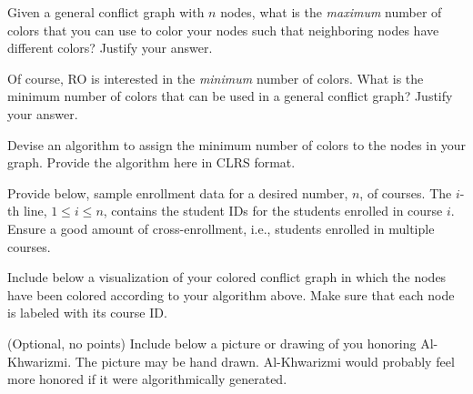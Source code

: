\documentclass[a4paper]{exam}
\begin{document}
\begin{questions}

\question
  Given a general conflict graph with $n$ nodes, what is the \textit{maximum} number of colors that you can use to color your nodes such that neighboring nodes have different colors? Justify your answer.
  \begin{solution}
    
  \end{solution}
\question
  Of course, RO is interested in the \textit{minimum} number of colors. What is the minimum number of colors that can be used in a general conflict graph? Justify your answer.
  \begin{solution}
    
  \end{solution}

\question
  Devise an algorithm to assign the minimum number of colors to the nodes in your graph. Provide the algorithm here in CLRS format.
  \begin{solution}
    
  \end{solution}

\question
  Provide below, sample enrollment data for a desired number, $n$, of courses. The $i$-th line, $1\le i\le n$, contains the student IDs for the students enrolled in course $i$. Ensure a good amount of cross-enrollment, i.e., students enrolled in multiple courses.
  \begin{solution}
    
  \end{solution}

\question
  Include below a visualization of your colored conflict graph in which the nodes have been colored according to your algorithm above. Make sure that each node is labeled with its course ID.
  \begin{solution}
    
  \end{solution}

  \bonusquestion (Optional, no points)
  Include below a picture or drawing of you honoring Al-Khwarizmi. The picture may be hand drawn. Al-Khwarizmi would probably feel more honored if it were algorithmically generated.
  \begin{solution}
    
  \end{solution}  
\end{questions}
\end{document}
